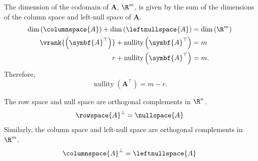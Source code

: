 \documentclass{article}
\DeclareMathOperator*{\nullity}{nullity}
\begin{document}
\begin{corollary}
    The dimension of the codomain of \(\symbf{A}\), \(\R^m\), is given by
    the sum of the dimensions of the column space and left-null space of \(\symbf{A}\).
    \begin{align*}
        \dim{\left( \columnspace{A} \right)} + \dim{\left( \leftnullspace{A} \right)}   & = \dim{\left( \R^m \right)} \\
        \vrank{\left( \symbf{A}^\top \right)} + \nullity{\left( \symbf{A}^\top \right)} & = m                         \\
        r + \nullity{\left( \symbf{A}^\top \right)}                                     & = m.
    \end{align*}
    Therefore,
    \begin{equation*}
        \nullity{\left( \symbf{A}^\top \right)} = m - r.
    \end{equation*}
\end{corollary}
\begin{theorem}
    The row space and null space are orthogonal complements in \(\R^n\).
    \begin{equation*}
        \rowspace{A}^\perp = \nullspace{A}
    \end{equation*}
    Similarly, the column space and left-null space are orthogonal complements in \(\R^m\).
    \begin{equation*}
        \columnspace{A}^\perp = \leftnullspace{A}
    \end{equation*}
\end{theorem}
\end{document}
